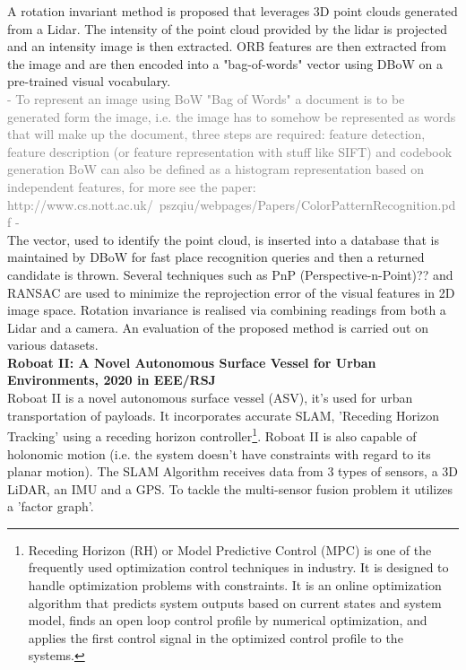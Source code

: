 \documentclass{article}
\begin{document}
A rotation invariant method is proposed that leverages 3D point clouds generated from a Lidar. The intensity of the point cloud provided by the lidar is projected and an intensity image is then extracted. ORB features are then extracted from the image and are then encoded into a "bag-of-words" vector using DBoW on a pre-trained visual vocabulary. 
\\
\textcolor{gray}{- To represent an image using BoW "Bag of Words" a document is to be generated form the image, i.e. the image has to somehow be represented as words that will make up the document, three steps are required: feature detection, feature description (or feature representation with stuff like SIFT) and codebook generation BoW can also be defined as a histogram representation based on independent features, for more see the paper:
\\ http://www.cs.nott.ac.uk/~pszqiu/webpages/Papers/ColorPatternRecognition.pdf -}
\\
The vector, used to identify the point cloud, is inserted into a database that is maintained by DBoW for fast place recognition queries and then a returned candidate is thrown. Several techniques such as PnP (Perspective-n-Point)?? and RANSAC are used to minimize the reprojection error of the visual features in 2D image space. Rotation invariance is realised via combining readings from both a Lidar and a camera. An evaluation of the proposed method is carried out on various datasets. 
\\
\textbf{Roboat II: A Novel Autonomous Surface Vessel for Urban Environments, 2020 in EEE/RSJ}
\\
Roboat II is a novel autonomous surface vessel (ASV), it's used for urban transportation of payloads. It incorporates accurate SLAM, 'Receding Horizon Tracking' using a receding horizon controller\footnote{Receding Horizon (RH) or Model Predictive Control (MPC) is one of the frequently used optimization control techniques in industry. It is designed to handle optimization problems with constraints. It is an online optimization algorithm that predicts system outputs based on current states and system model, finds an open loop control profile by numerical optimization, and applies the first control signal in the optimized control profile to the systems.}. Roboat II is also capable of holonomic motion (i.e. the system doesn't have constraints with regard to its planar motion). 
The SLAM Algorithm receives data from 3 types of sensors, a 3D LiDAR, an IMU and a GPS. To tackle the multi-sensor fusion problem it utilizes a 'factor graph'.
\end{document}
